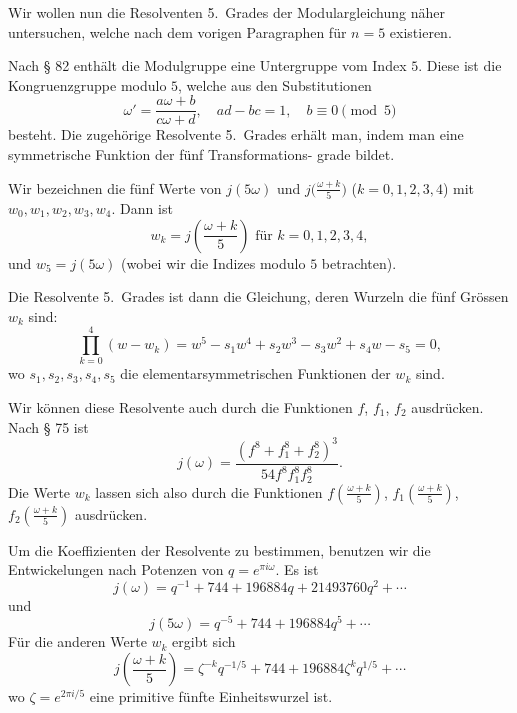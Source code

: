 \documentclass[12pt,a4paper]{article}
\theoremstyle{definition}
\begin{document}
Wir wollen nun die Resolventen 5.~Grades der Modulargleichung
n\"aher untersuchen, welche nach dem vorigen Paragraphen f\"ur
$n = 5$ existieren.

Nach \S{} 82 enth\"alt die Modulgruppe eine Untergruppe vom
Index $5$. Diese ist die Kongruenzgruppe modulo $5$, welche aus
den Substitutionen
\begin{equation}\tag{1}
\omega' = \frac{a\omega + b}{c\omega + d}, \quad ad - bc = 1, \quad b \equiv 0 \pmod{5}
\end{equation}
besteht. Die zugeh\"orige Resolvente 5.~Grades erh\"alt man,
indem man eine symmetrische Funktion der f\"unf Transformations-
grade bildet.

Wir bezeichnen die f\"unf Werte von $j(5\omega)$ und\allowbreak
$j\bigl(\frac{\omega+k}{5}\bigr)$ ($k = 0, 1, 2, 3, 4$) mit\allowbreak
$w_0, w_1, w_2, w_3, w_4$. Dann ist
\begin{equation}\tag{2}
w_k = j\left(\frac{\omega+k}{5}\right) \text{ f\"ur } k = 0, 1, 2, 3, 4,
\end{equation}
und $w_5 = j(5\omega)$ (wobei wir die Indizes modulo $5$ betrachten).

Die Resolvente 5.~Grades ist dann die Gleichung, deren
Wurzeln die f\"unf Gr\"ossen $w_k$ sind:
\begin{equation}\tag{3}
\prod_{k=0}^{4} (w - w_k) = w^5 - s_1 w^4 + s_2 w^3 - s_3 w^2 + s_4 w - s_5 = 0,
\end{equation}
wo $s_1, s_2, s_3, s_4, s_5$ die elementarsymmetrischen Funktionen
der $w_k$ sind.

Wir k\"onnen diese Resolvente auch durch die Funktionen
$f$, $f_1$, $f_2$ ausdr\"ucken. Nach \S{} 75 ist
\begin{equation}\tag{4}
j(\omega) = \frac{(f^8 + f_1^8 + f_2^8)^3}{54 f^8 f_1^8 f_2^8}.
\end{equation}
Die Werte $w_k$ lassen sich also durch die Funktionen
$f\left(\frac{\omega+k}{5}\right)$, $f_1\left(\frac{\omega+k}{5}\right)$,
$f_2\left(\frac{\omega+k}{5}\right)$ ausdr\"ucken.

Um die Koeffizienten der Resolvente zu bestimmen, benutzen
wir die Entwickelungen nach Potenzen von $q = e^{\pi i \omega}$.
Es ist
\begin{equation}\tag{5}
j(\omega) = q^{-1} + 744 + 196884q + 21493760q^2 + \cdots
\end{equation}
und
\begin{equation}\tag{6}
j(5\omega) = q^{-5} + 744 + 196884q^5 + \cdots
\end{equation}
F\"ur die anderen Werte $w_k$ ergibt sich
\begin{equation}\tag{7}
j\left(\frac{\omega+k}{5}\right) = \zeta^{-k} q^{-1/5} + 744 + 196884 \zeta^k q^{1/5} + \cdots
\end{equation}
wo $\zeta = e^{2\pi i / 5}$ eine primitive f\"unfte Einheitswurzel ist.
\end{document}
